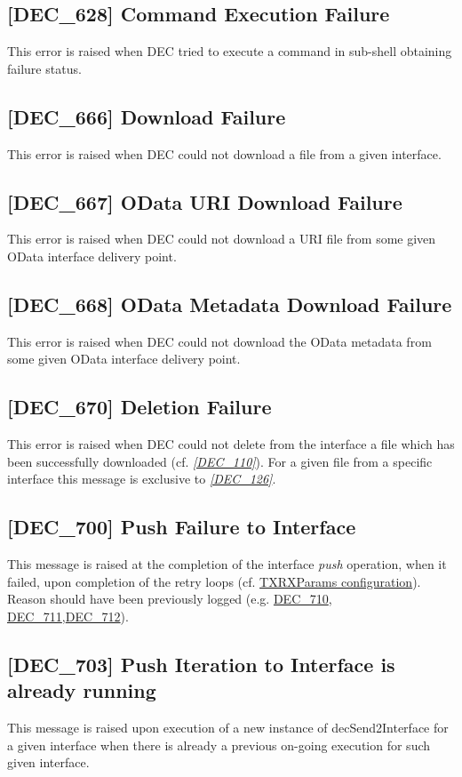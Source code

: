 \documentclass[dec_sum_main.tex]{subfiles}
\begin{document}
\subsection{[DEC\_628] Command Execution Failure}
\label{DEC628}
This error is raised when DEC tried to execute a command in sub-shell obtaining failure status.

\subsection{[DEC\_666] Download Failure}
\label{DEC666}
This error is raised when DEC could not download a file from a given interface.

\subsection{[DEC\_667] OData URI Download Failure}
\label{DEC667}
This error is raised when DEC could not download a URI file from some given OData interface delivery point.

\subsection{[DEC\_668] OData Metadata Download Failure}
\label{DEC668}
This error is raised when DEC could not download the OData metadata from some given OData interface delivery point.

\label{DEC670}
\subsection{[DEC\_670] Deletion Failure}
This error is raised when DEC could not delete from the interface a file which has been successfully downloaded (cf. \hyperref[DEC110]{\textit{[DEC\_110]}}).
For a given file from a specific interface this message is exclusive to \hyperref[DEC126]{\textit{[DEC\_126]}}.

\label{DEC700}
\subsection{[DEC\_700] Push Failure to Interface}
This message is raised at the completion of the interface \textit{push} operation, when it failed, upon completion of the retry loops (cf. \hyperref[TXRXParams]{TXRXParams configuration}). Reason should have been previously logged (e.g. \hyperref[DEC710]{DEC\_710}, \hyperref[DEC711]{DEC\_711},\hyperref[DEC712]{DEC\_712}). 

\label{DEC703}
\subsection{[DEC\_703]  Push Iteration to Interface is already running}
This message is raised upon execution of a new instance of decSend2Interface for a given interface when there is already a previous on-going execution for such given interface.
\end{document}
